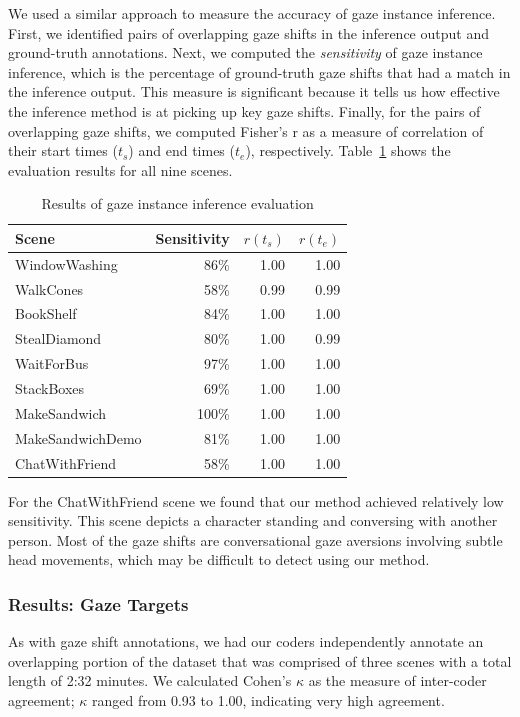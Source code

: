 We used a similar approach to measure the accuracy of gaze instance inference. First, we identified pairs of overlapping gaze shifts in the inference output and ground-truth annotations. Next, we computed the \emph{sensitivity} of gaze instance inference, which is the percentage of ground-truth gaze shifts that had a match in the inference output. This measure is significant because it tells us how effective the inference method is at picking up key gaze shifts. Finally, for the pairs of overlapping gaze shifts, we computed Fisher's r as a measure of correlation of their start times ($t_s$) and end times ($t_e$), respectively. Table~\ref{tab:GazeShiftInferenceResults} shows the evaluation results for all nine scenes.

\begin{table}
\small
\centering
\def\arraystretch{1.5}
\begin{tabular}{lrrr}
\hline
\textbf{Scene} & \textbf{Sensitivity} & $r(t_s)$ & $r(t_e)$ \\
\hline
WindowWashing & 86\% & 1.00 & 1.00 \\
WalkCones & 58\% & 0.99 & 0.99 \\
BookShelf & 84\% & 1.00 & 1.00 \\
StealDiamond & 80\% & 1.00 & 0.99 \\
WaitForBus & 97\% & 1.00 & 1.00 \\
StackBoxes & 69\% & 1.00 & 1.00 \\
MakeSandwich & 100\% & 1.00 & 1.00 \\
MakeSandwichDemo & 81\% & 1.00 & 1.00 \\
ChatWithFriend & 58\% & 1.00 & 1.00 \\
\hline
\end{tabular}
\caption{Results of gaze instance inference evaluation}
\label{tab:GazeShiftInferenceResults}
\end{table}

For the ChatWithFriend scene we found that our method achieved relatively low sensitivity. This scene depicts a character standing and conversing with another person. Most of the gaze shifts are conversational gaze aversions involving subtle head movements, which may be difficult to detect using our method.

\subsubsection{Results: Gaze Targets}

As with gaze shift annotations, we had our coders independently annotate an overlapping portion of the dataset that was comprised of three scenes with a total length of 2:32 minutes. We calculated Cohen's $\kappa$ as the measure of inter-coder agreement; $\kappa$ ranged from 0.93 to 1.00, indicating very high agreement.

